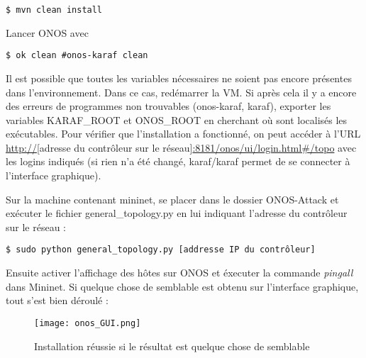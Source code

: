 \begin{verbatim}
$ mvn clean install
\end{verbatim}

Lancer ONOS avec
\begin{verbatim}
$ ok clean #onos-karaf clean
\end{verbatim}

Il est possible que toutes les variables nécessaires ne soient pas encore présentes dans l'environnement. Dans ce cas, redémarrer la VM. Si après cela il y a encore des erreurs de programmes non trouvables (onos-karaf, karaf), exporter les variables KARAF\_ROOT et ONOS\_ROOT en cherchant où sont localisés les exécutables.
Pour vérifier que l'installation a fonctionné, on peut accéder à l'URL \url{http://}[adresse du contrôleur sur le réseau]\url{:8181/onos/ui/login.html\#/topo} avec les logins indiqués (si rien n'a été changé, karaf/karaf permet de se connecter à l'interface graphique).

Sur la machine contenant mininet, se placer dans le dossier ONOS-Attack et exécuter le fichier general\_topology.py en lui indiquant l'adresse du contrôleur sur le réseau :
\begin{verbatim}
$ sudo python general_topology.py [addresse IP du contrôleur]
\end{verbatim}

Ensuite activer l'affichage des hôtes sur ONOS et éxecuter la commande \textit{pingall} dans Mininet. Si quelque chose de semblable est obtenu sur l'interface graphique, tout s'est bien déroulé :
\begin{figure}[h]
  	\centering
  	\texttt{[image: onos\_GUI.png]}
  	\caption{Installation réussie si le résultat est quelque chose de semblable}
\end{figure}